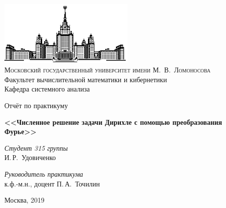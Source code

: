 \documentclass{subfiles}
\begin{document}
\thispagestyle{empty}

\begin{center}
\ \vspace{-3cm}

\includegraphics[width=0.5\textwidth]{msu.eps}\\
{\scshape Московский государственный университет имени М.~В.~Ломоносова}\\
Факультет вычислительной математики и кибернетики\\
Кафедра системного анализа

\vfill

{\LARGE Отчёт по практикуму}

\vspace{1cm}

{\Huge\bfseries <<Численное решение задачи Дирихле с помощью преобразования Фурье>>}
\end{center}

\vspace{1cm}

\begin{flushright}
  \large
  \textit{Студент 315 группы}\\
  И.\,Р.~Удовиченко

  \vspace{5mm}

  \textit{Руководитель практикума}\\
  к.ф.-м.н., доцент П.\,А.~Точилин
\end{flushright}

\vfill

\begin{center}
Москва, 2019
\end{center}

\newpage
\end{document}

